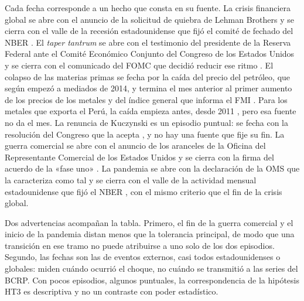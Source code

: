Cada fecha corresponde a un hecho que consta en su fuente. La crisis financiera global se abre con
el anuncio de la solicitud de quiebra de Lehman Brothers \parencite{lehman_brothers_2008} y se
cierra con el valle de la recesión estadounidense que fijó el comité de fechado del NBER
\parencite{nber_2010}. El \emph{taper tantrum} se abre con el testimonio del presidente de la
Reserva Federal ante el Comité Económico Conjunto del Congreso de los Estados Unidos
\parencite{bernanke_2013} y se cierra con el
comunicado del FOMC que decidió reducir ese ritmo \parencite{reserva_federal_2013}. El colapso de
las materias primas se fecha por la caída del precio del petróleo, que según
\textcite{stocker_et_al_2015} empezó a mediados de 2014, y termina el mes anterior al primer
aumento de los precios de los metales y del índice general que informa el FMI
\parencite{fmi_2016}. Para los metales que exporta el Perú, la caída empieza antes, desde 2011
\parencite{fmi_2015b}, pero esa fuente no da el mes. La renuncia de Kuczynski es un episodio puntual: se fecha
con la resolución del Congreso que la acepta \parencite{congreso_2018}, y no hay una fuente que fije su fin. La guerra comercial se abre con el
anuncio de los aranceles de la Oficina del Representante Comercial de los Estados Unidos
\parencite{ustr_2018} y se cierra con la firma del acuerdo de la «fase uno»
\parencite{ustr_2020}. La pandemia se abre con la declaración de la OMS que la caracteriza como
tal \parencite{oms_2020b} y se cierra con el valle de la actividad mensual estadounidense que fijó
el NBER \parencite{nber_2021}, con el mismo criterio que el fin de la crisis global.

Dos advertencias acompañan la tabla. Primero, el fin de la guerra comercial y el inicio de la
pandemia distan menos que la tolerancia principal, de modo que una transición en ese tramo no
puede atribuirse a uno solo de los dos episodios. Segundo, las fechas son las de eventos
externos, casi todos estadounidenses o globales: miden cuándo ocurrió el choque, no cuándo se
transmitió a las series del BCRP. Con pocos episodios, algunos puntuales, la correspondencia de la
hipótesis HT3 es descriptiva y no un contraste con poder estadístico.

